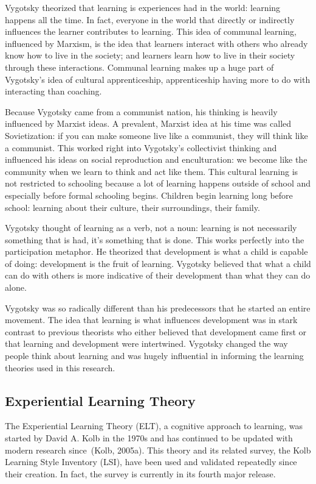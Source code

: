Vygotsky theorized that learning is experiences had in the world: learning happens all the time. In fact, everyone in the world that directly or indirectly influences the learner contributes to learning. This idea of communal learning, influenced by Marxism, is the idea that learners interact with others who already know how to live in the society; and learners learn how to live in their society through these interactions. Communal learning makes up a huge part of Vygotsky's idea of cultural apprenticeship, apprenticeship having more to do with interacting than coaching.

Because Vygotsky came from a communist nation, his thinking is heavily influenced by Marxist ideas. A prevalent, Marxist idea at his time was called Sovietization: if you can make someone live like a communist, they will think like a communist. This worked right into Vygotsky's collectivist thinking and influenced his ideas on social reproduction and enculturation: we become like the community when we learn to think and act like them. This cultural learning is not restricted to schooling because a lot of learning happens outside of school and especially before formal schooling begins. Children begin learning long before school: learning about their culture, their surroundings, their family.

Vygotsky thought of learning as a verb, not a noun: learning is not necessarily something that is had, it's something that is done. This works perfectly into the participation metaphor. He theorized that development is what a child is capable of doing: development is the fruit of learning. Vygotsky believed that what a child can do with others is more indicative of their development than what they can do alone.

Vygotsky was so radically different than his predecessors that he started an entire movement. The idea that learning is what influences development was in stark contrast to previous theorists who either believed that development came first or that learning and development were intertwined. Vygotsky changed the way people think about learning and was hugely influential in informing the learning theories used in this research.

\subsection{Experiential Learning Theory}
The Experiential Learning Theory (ELT), a cognitive approach to learning, was started by David A. Kolb in the 1970s and has continued to be updated with modern research since~(Kolb, 2005a). This theory and its related survey, the Kolb Learning Style Inventory (LSI), have been used and validated repeatedly since their creation. In fact, the survey is currently in its fourth major release.

